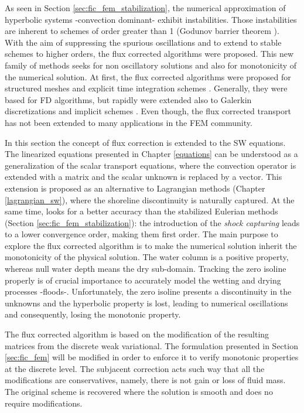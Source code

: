As seen in Section \ref{sec:fic_fem_stabilization}, the numerical approximation of hyperbolic systems -convection dominant- exhibit instabilities. Those instabilities are inherent to schemes of order greater than 1 (Godunov barrier theorem \cite{godunov1959}). With the aim of suppressing the spurious oscillations and to extend to stable schemes to higher orders, the flux corrected algorithms were proposed.
This new family of methods seeks for non oscillatory solutions and also for monotonicity of the numerical solution. At first, the flux corrected algorithms were proposed for structured meshes and explicit time integration schemes \cite{boris1973, book1975}. Generally, they were based for FD algorithms, but rapidly were extended also to Galerkin discretizations and implicit schemes \cite{kuzmin2001, lohner2008ch9}. Even though, the flux corrected transport has not been extended to many applications in the FEM community.


In this section the concept of flux correction is extended to the SW equations. The linearized equations presented in Chapter \ref{equations} can be understood as a generalization of the scalar transport equations, where the convection operator is extended with a matrix and the scalar unknown is replaced by a vector. This extension is proposed as an alternative to Lagrangian methods (Chapter \ref{lagrangian_sw}), where the shoreline discontinuity is naturally captured. At the same time, looks for a better accuracy than the stabilized Eulerian methods (Section \ref{sec:fic_fem_stabilization}):
the introduction of the \emph{shock capturing} leads to a lower convergence order, making them first order. The main purpose to explore the flux corrected algorithm is to make the numerical solution inherit the monotonicity of the physical solution. The water column is a positive property, whereas null water depth means the dry sub-domain.
Tracking the zero isoline properly is of crucial importance to accurately model the wetting and drying processes -floods-. Unfortunately, the zero isoline presents a discontinuity in the unknowns and the hyperbolic property is lost, leading to numerical oscillations and consequently, losing the monotonic property.


The flux corrected algorithm is based on the modification of the resulting matrices from the discrete weak variational. The formulation presented in Section \ref{sec:fic_fem} will be modified in order to enforce it to verify monotonic properties at the discrete level. The subjacent correction acts such way that all the modifications are conservatives, namely, there is not gain or loss of fluid mass. The original scheme is recovered where the solution is smooth and does no require modifications.


